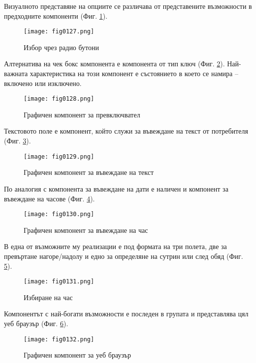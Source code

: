 Визуалното представяне на опциите се различава от представените възможности в предходните компоненти (Фиг. \ref{fig0127}).

\begin{figure}[H]
  \centering
  \texttt{[image: fig0127.png]}
  \caption{Избор чрез радио бутони}
\label{fig0127}
\end{figure}

Алтернатива на чек бокс компонента е компонента от тип ключ (Фиг. \ref{fig0128}). Най-важната характеристика на този компонент е състоянието в което се намира – включено или изключено. 

\begin{figure}[H]
  \centering
  \texttt{[image: fig0128.png]}
  \caption{Графичен компонент за превключвател}
\label{fig0128}
\end{figure}

Текстовото поле е компонент, който служи за въвеждане на текст от потребителя (Фиг. \ref{fig0129}).

\begin{figure}[H]
  \centering
  \texttt{[image: fig0129.png]}
  \caption{Графичен компонент за въвеждане на текст}
\label{fig0129}
\end{figure}

По аналогия с компонента за въвеждане на дати е наличен и компонент за въвеждане на часове (Фиг. \ref{fig0130}). 

\begin{figure}[H]
  \centering
  \texttt{[image: fig0130.png]}
  \caption{Графичен компонент за въвеждане на час}
\label{fig0130}
\end{figure}

В една от възможните му реализации е под формата на три полета, две за превъртане нагоре/надолу и едно за определяне на сутрин или след обяд (Фиг. \ref{fig0131}).

\begin{figure}[H]
  \centering
  \texttt{[image: fig0131.png]}
  \caption{Избиране на час}
\label{fig0131}
\end{figure}

Компонентът с най-богати възможности е последен в групата и представлява цял уеб браузър (Фиг. \ref{fig0132}).

\begin{figure}[H]
  \centering
  \texttt{[image: fig0132.png]}
  \caption{Графичен компонент за уеб браузър}
\label{fig0132}
\end{figure}

